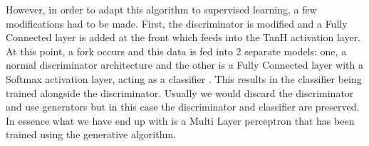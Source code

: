 \noindent However, in order to adapt this algorithm to supervised learning, a few modifications had to be made. First, the discriminator is modified and a Fully Connected layer is added at the front which feeds into the TanH activation layer. At this point, a fork occurs and this data is fed into 2 separate models: one, a normal discriminator architecture and the other is a Fully Connected layer with a Softmax activation layer, acting as a classifier \cite{brownlee_2020}. This results in the classifier being trained alongside the discriminator. Usually we would discard the discriminator and use generators but in this case the discriminator and classifier are preserved. In essence what we have end up with is a Multi Layer perceptron that has been trained using the generative algorithm. 
